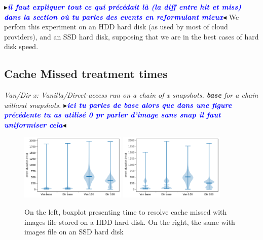 \documentclass[sigplan,screen,10pt]{acmart}
\newcommand{\mynote}[2]{\fbox{\bfseries\sffamily\footnotesize{\textbf{#1}}}
 {\small$\blacktriangleright$\textsf{\emph{#2}}$\blacktriangleleft$}}
\newcommand{\mynote}[2]{}
\newcommand{\stella}[1]{\mynote{\textcolor{red}{Stella}}{\textcolor{blue}{\textbf{#1}}}}
\begin{document}
	\stella{il faut expliquer tout ce qui précédait là (la diff entre hit et miss) dans la section où tu parles des events en reformulant mieux}
	We perfom this experiment on an HDD hard disk (as used by most of cloud providers), and an SSD hard disk, supposing that we are in the best cases of hard disk speed.
	
	\subsection*{Cache Missed treatment times}
	
	\textit{Van/Dir x: Vanilla/Direct-access run on a chain of x snapshots. \textbf{base} for a chain without snapshots. \stella{ici tu parles de base alors que dans une figure précédente tu as utilisé 0 pr parler d'image sans snap il faut uniformiser cela}}
	\begin{figure}[h]
		\center
		\includegraphics[width=0.45\textwidth]{MISSED_time_hdd.pdf}
		\includegraphics[width=0.45\textwidth]{MISSED_time_ssd.pdf}
		\caption{On the left, boxplot presenting time to resolve cache missed with images file stored on a HDD hard disk. On the right, the same with images file on an SSD hard disk}
		\label{fig:fig-a}
	\end{figure}
\end{document}
